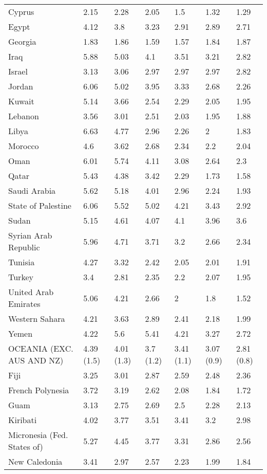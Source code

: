\begin{longtable}[t]{lllllll}
Cyprus & 2.15 & 2.28 & 2.05 & 1.5 & 1.32 & 1.29\\
Egypt & 4.12 & 3.8 & 3.23 & 2.91 & 2.89 & 2.71\\
Georgia & 1.83 & 1.86 & 1.59 & 1.57 & 1.84 & 1.87\\
Iraq & 5.88 & 5.03 & 4.1 & 3.51 & 3.21 & 2.82\\
Israel & 3.13 & 3.06 & 2.97 & 2.97 & 2.97 & 2.82\\
Jordan & 6.06 & 5.02 & 3.95 & 3.33 & 2.68 & 2.26\\
Kuwait & 5.14 & 3.66 & 2.54 & 2.29 & 2.05 & 1.95\\
Lebanon & 3.56 & 3.01 & 2.51 & 2.03 & 1.95 & 1.88\\
Libya & 6.63 & 4.77 & 2.96 & 2.26 & 2 & 1.83\\
Morocco & 4.6 & 3.62 & 2.68 & 2.34 & 2.2 & 2.04\\
Oman & 6.01 & 5.74 & 4.11 & 3.08 & 2.64 & 2.3\\
Qatar & 5.43 & 4.38 & 3.42 & 2.29 & 1.73 & 1.58\\
Saudi Arabia & 5.62 & 5.18 & 4.01 & 2.96 & 2.24 & 1.93\\
State of Palestine & 6.06 & 5.52 & 5.02 & 4.21 & 3.43 & 2.92\\
Sudan & 5.15 & 4.61 & 4.07 & 4.1 & 3.96 & 3.6\\
Syrian Arab Republic & 5.96 & 4.71 & 3.71 & 3.2 & 2.66 & 2.34\\
Tunisia & 4.27 & 3.32 & 2.42 & 2.05 & 2.01 & 1.91\\
Turkey & 3.4 & 2.81 & 2.35 & 2.2 & 2.07 & 1.95\\
United Arab Emirates & 5.06 & 4.21 & 2.66 & 2 & 1.8 & 1.52\\
Western Sahara & 4.21 & 3.63 & 2.89 & 2.41 & 2.18 & 1.99\\
Yemen & 4.22 & 5.6 & 5.41 & 4.21 & 3.27 & 2.72\\
OCEANIA (EXC. AUS AND NZ) & 4.39 (1.5) & 4.01 (1.3) & 3.7 (1.2) & 3.41 (1.1) & 3.07 (0.9) & 2.81 (0.8)\\
Fiji & 3.25 & 3.01 & 2.87 & 2.59 & 2.48 & 2.36\\
French Polynesia & 3.72 & 3.19 & 2.62 & 2.08 & 1.84 & 1.72\\
Guam & 3.13 & 2.75 & 2.69 & 2.5 & 2.28 & 2.13\\
Kiribati & 4.02 & 3.77 & 3.51 & 3.41 & 3.2 & 2.98\\
Micronesia (Fed. States of) & 5.27 & 4.45 & 3.77 & 3.31 & 2.86 & 2.56\\
New Caledonia & 3.41 & 2.97 & 2.57 & 2.23 & 1.99 & 1.84\\

\end{longtable}
